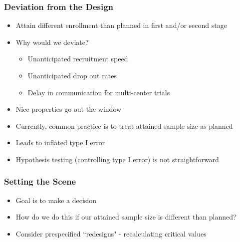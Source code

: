 \documentclass{beamer}\usepackage[]{graphicx}\usepackage[]{color}
\begin{document}
\begin{frame}
\frametitle{Deviation from the Design}
    \begin{itemize}
        \item Attain different enrollment than planned in first and/or second stage
        \item Why would we deviate?
          \begin{itemize}
            \item Unanticipated recruitment speed
            \item Unanticipated drop out rates
            \item Delay in communication for multi-center trials
          \end{itemize}
        \item Nice properties go out the window
        \item Currently, common practice is to treat attained sample size as planned
        \item Leads to inflated type I error
        \item Hypothesis testing (controlling type I error) is not straightforward
    \end{itemize}
\end{frame}

\begin{frame}
\frametitle{Setting the Scene}
    \begin{itemize}
        \item Goal is to make a decision
        \item How do we do this if our attained sample size is different than planned?
        \item Consider prespecified ``redesigns" - recalculating critical values
    \end{itemize}
\end{frame}


\end{document}
